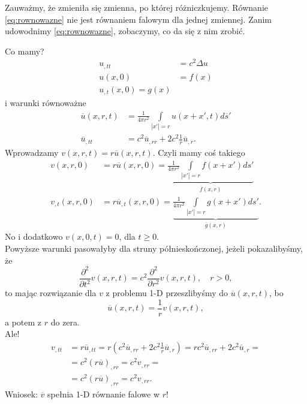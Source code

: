 \documentclass[../main.tex]{subfiles}
\begin{document}
		Zauważmy, że zmieniła się zmienna, po której różniczkujemy. Równanie \ref{eq:rownowazne} nie jest równaniem falowym dla jednej zmiennej. Zanim udowodnimy \ref{eq:rownowazne}, zobaczymy, co da się z nim zrobić.

		Co mamy?
		\begin{align*}
				u_{,t t} &= c^2 \Delta u\\
				u(x,0) &= f(x)\\
				u_{,t}(x,0) = g(x)
		\end{align*}
		i warunki równoważne
		\begin{align*}
				\overline{u} (x,r,t) &= \frac{1}{4\pi r^2} \int\limits_{|x'|=r}u(x+x',t)d \overline{s}'\\
				\overline{u}_{,t t} &= c^2 \overline{u}_{,r r} + 2c^2 \frac{1}{r} \overline{u} _{,r}
		.\end{align*}
		Wprowadzamy $v(x,r,t) = r \overline{u} (x,r,t)$. Czyli mamy coś takiego
		\begin{align*}
				v(x,r,0) &= r \overline{u} (x,r,0) = \underbrace{\frac{1}{4\pi r^2} \int\limits_{|x'| = r}f(x+x')d s'}_{\overline{f} (x,r)}\\
				v_{,t}(x,r,0) &= r \overline{u} _{,t}(x,r,0) = \underbrace{\frac{1}{4\pi r^2} \int\limits_{|x'|=r} g(x+x')d s'}_{\overline{g} (x,r)}
		.\end{align*}
		No i dodatkowo $v(x,0,t) = 0$, dla  $t\ge 0$.\\
		Powyższe warunki pasowałyby dla struny półnieskończonej, jeżeli pokazalibyśmy, że
		\[
				\frac{\partial ^2}{\partial t^2} v(x,r,t) = c^2 \frac{\partial ^2}{\partial r^2} v(x,r,t),\quad r>0
		,\]
		to mając rozwiązanie dla $v$ z problemu 1-D przeszlibyśmy do $\overline{u} (x,r,t)$, bo \[
				\overline{u} (x,r,t) = \frac{1}{r}v(x,r,t)
		,\]
		a potem z $r$ do zera.\\
		Ale!
		\begin{align*}
				v_{,t t} &= r \overline{u} _{,t t} = r\left( c^2 \overline{u} _{,rr} + 2 c^2 \frac{1}{r} \overline{u} _{,r} \right) = rc^2 \overline{u} _{,rr} + 2c^2 \overline{u} _{,r} = \\
				&= c^2 \left( r \overline{u}\right) _{,rr} = c^2 v_{,rr} = \\
				&= c^2 \left( r \overline{u}  \right) _{,rr} = c^2 v_{,rr}
		.\end{align*}
		Wniosek: $\overline{v} $ spełnia 1-D równanie falowe w $r$!
\end{document}
